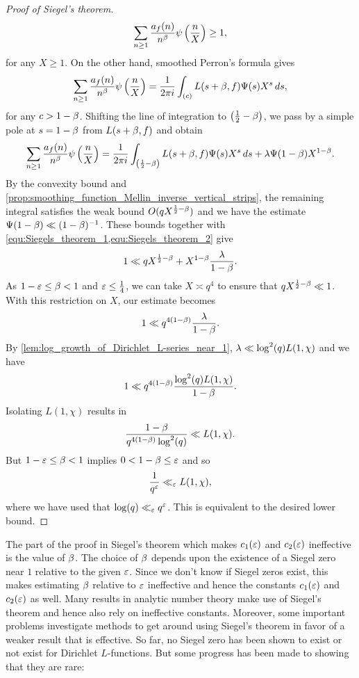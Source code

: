 \begin{proof}[Proof of Siegel's theorem]
      \begin{equation}\label{equ:Siegels_theorem_1}
        \sum_{n \ge 1}\frac{a_{f}(n)}{n^{\beta}}\psi\left(\frac{n}{X}\right) \ge 1,
      \end{equation}
      for any $X \ge 1$. On the other hand, smoothed Perron's formula gives
      \[
        \sum_{n \ge 1}\frac{a_{f}(n)}{n^{\beta}}\psi\left(\frac{n}{X}\right) = \frac{1}{2\pi i}\int_{(c)}L(s+\beta,f)\Psi(s)X^{s}\,ds,
      \]
      for any $c > 1-\beta$. Shifting the line of integration to $\left(\frac{1}{2}-\beta\right)$, we pass by a simple pole at $s = 1-\beta$ from $L(s+\beta,f)$ and obtain
      \begin{equation}\label{equ:Siegels_theorem_2}
        \sum_{n \ge 1}\frac{a_{f}(n)}{n^{\beta}}\psi\left(\frac{n}{X}\right) = \frac{1}{2\pi i}\int_{\left(\frac{1}{2}-\beta\right)}L(s+\beta,f)\Psi(s)X^{s}\,ds+\lambda\Psi(1-\beta)X^{1-\beta}.
      \end{equation}
      By the convexity bound and \cref{prop:smoothing_function_Mellin_inverse_vertical_strips}, the remaining integral satisfies the weak bound $O(qX^{\frac{1}{2}-\beta})$ and we have the estimate $\Psi(1-\beta) \ll (1-\beta)^{-1}$. These bounds together with \cref{equ:Siegels_theorem_1,equ:Siegels_theorem_2} give
      \[
        1 \ll qX^{\frac{1}{2}-\beta}+X^{1-\beta}\frac{\lambda}{1-\beta}.
      \]
      As $1-\varepsilon \le \beta < 1$ and $\varepsilon \le \frac{1}{4}$, we can take $X \asymp q^{4}$ to ensure that $qX^{\frac{1}{2}-\beta} \ll 1$. With this restriction on $X$, our estimate becomes
      \[
        1 \ll q^{4(1-\beta)}\frac{\lambda}{1-\beta}.
      \]
      By \cref{lem:log_growth_of_Dirichlet_L-series_near_1}, $\lambda \ll \log^{2}(q)L(1,\chi)$ and we have
      \[
        1 \ll q^{4(1-\beta)}\frac{\log^{2}(q)L(1,\chi)}{1-\beta}.
      \]
      Isolating $L(1,\chi)$ results in
      \[
        \frac{1-\beta}{q^{4(1-\beta)}\log^{2}(q)} \ll L(1,\chi).
      \]
      But $1-\varepsilon \le \beta < 1$ implies $0< 1-\beta \le \varepsilon$ and so
      \[
        \frac{1}{q^{\varepsilon}} \ll_{\varepsilon} L(1,\chi),
      \]
      where we have used that $\log(q) \ll_{\varepsilon} q^{\varepsilon}$. This is equivalent to the desired lower bound.
    \end{proof}

    The part of the proof in Siegel's theorem which makes $c_{1}(\varepsilon)$ and $c_{2}(\varepsilon)$ ineffective is the value of $\beta$. The choice of $\beta$ depends upon the existence of a Siegel zero near $1$ relative to the given $\varepsilon$. Since we don't know if Siegel zeros exist, this makes estimating $\beta$ relative to $\varepsilon$ ineffective and hence the constants $c_{1}(\varepsilon)$ and $c_{2}(\varepsilon)$ as well. Many results in analytic number theory make use of Siegel's theorem and hence also rely on ineffective constants. Moreover, some important problems investigate methods to get around using Siegel's theorem in favor of a weaker result that is effective. So far, no Siegel zero has been shown to exist or not exist for Dirichlet $L$-functions. But some progress has been made to showing that they are rare:

